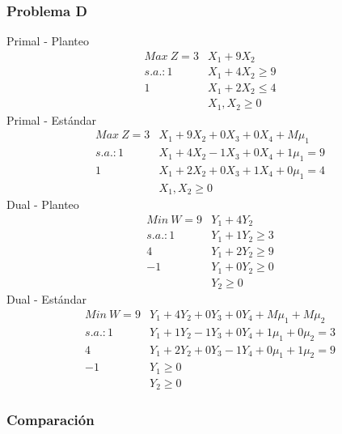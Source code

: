 \begin{homeworkProblem}
\subsubsection{Problema D}
Primal - Planteo
\begin{align*}
Max\ Z = 3&X_1 + 9X_2 \\
s.a.: 1&X_1 + 4X_2 \ge 9 \\
1&X_1 + 2X_2 \le 4 \\
&X_1,X_2 \ge 0
\end{align*}
Primal - Estándar
\begin{align*}
Max\ Z = 3&X_1 + 9X_2 + 0X_3 + 0X_4 + M\mu_1\\
s.a.: 1&X_1 + 4X_2 - 1X_3 + 0X_4 + 1\mu_1 = 9 \\
1&X_1 + 2X_2 + 0X_3 + 1X_4 + 0\mu_1 = 4 \\
&X_1,X_2 \ge 0
\end{align*}
Dual - Planteo
\begin{align*}
Min\ W = 9&Y_1 + 4Y_2 \\
s.a.: 1&Y_1 + 1Y_2 \ge 3 \\
4&Y_1 + 2Y_2 \ge 9 \\
-1&Y_1 + 0Y_2 \ge 0 \\
&Y_2 \ge 0
\end{align*}
Dual - Estándar
\begin{align*}
Min\ W = 9&Y_1 + 4Y_2 + 0Y_3 + 0Y_4 + M\mu_1 + M\mu_2 \\
s.a.: 1&Y_1 + 1Y_2  - 1Y_3 + 0Y_4 + 1\mu_1 + 0\mu_2 = 3 \\
4&Y_1 + 2Y_2 + 0Y_3 - 1Y_4 + 0\mu_1 + 1\mu_2 = 9\\
-1&Y_1 \ge 0 \\
&Y_2 \ge 0
\end{align*}

\subsubsection{Comparación}
\end{homeworkProblem}

\pagebreak %
\begin{homeworkProblem}[-1][Propiedades]
\end{homeworkProblem}


